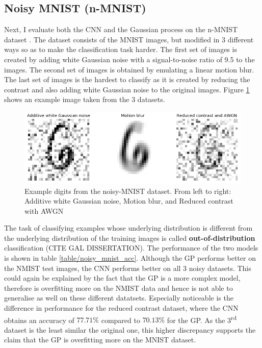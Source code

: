 \documentclass{article}
\begin{document}
\subsection{Noisy MNIST (n-MNIST)}
Next, I evaluate both the CNN and the Gaussian process on the n-MNIST dataset \cite{DBLP:journals/corr/BasuKGDMN15}. The dataset consists of the MNIST images, but modified in 3 different ways so as to make the classification task harder. The first set of images is created by adding white Gaussian noise with a signal-to-noise ratio of 9.5 to the images. The second set of images is obtained by emulating a linear motion blur. The last set of images is the hardest to classify as it is created by reducing the contrast and also adding white Gaussian noise to the original images. Figure \ref{fig/noisy_mnist_example} shows an example image taken from the 3 datasets.

\begin{figure}
	\centering
	\includegraphics[scale=0.2]{noisy_mnist_example}
	\caption{Example digits from the noisy-MNIST dataset. From left to right: Additive white Gaussian noise, Motion blur, and Reduced contrast with AWGN}
	\label{fig/noisy_mnist_example}
\end{figure}

The task of classifying examples whose underlying distribution is different from the underlying distribution of the training images is called \textbf{out-of-distribution} classification (CITE GAL DISSERTATION). The performance of the two models is shown in table \ref{table/noisy_mnist_acc}. Although the GP performs better on the NMIST test images, the CNN performs better on all 3 noisy datasets. This could again be explained by the fact that the GP is a more complex model, therefore is overfitting more on the NMIST data and hence is not able to generalise as well on these different datatsets. Especially noticeable is the difference in performance for the reduced contrast dataset, where the CNN obtains an accuracy of $77.71\%$ compared to $70.13\%$ for the GP. As the 3\textsuperscript{rd} dataset is the least similar the original one, this higher discrepancy supports the claim that the GP is overfitting more on the MNIST dataset.
\end{document}
